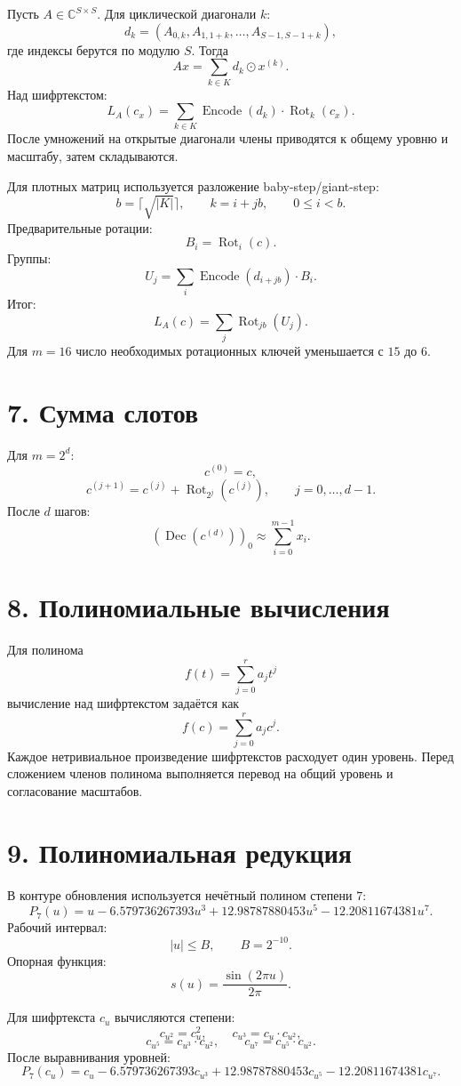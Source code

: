 \documentclass[12pt]{article}
\newcommand{\Dec}{\operatorname{Dec}}
\newcommand{\Encode}{\operatorname{Encode}}
\newcommand{\Rot}{\operatorname{Rot}}
\begin{document}
Пусть \(A\in\mathbb{C}^{S\times S}\). Для циклической диагонали \(k\):
\[
    d_k=(A_{0,k},A_{1,1+k},\ldots,A_{S-1,S-1+k}),
\]
где индексы берутся по модулю \(S\). Тогда
\[
    Ax=\sum_{k\in K}d_k\odot x^{(k)}.
\]
Над шифртекстом:
\[
    L_A(c_x)=
    \sum_{k\in K}\Encode(d_k)\cdot\Rot_k(c_x).
\]
После умножений на открытые диагонали члены приводятся к общему уровню и
масштабу, затем складываются.

Для плотных матриц используется разложение baby-step/giant-step:
\[
    b=\lceil\sqrt{|K|}\rceil,\qquad k=i+jb,\qquad 0\leq i<b.
\]
Предварительные ротации:
\[
    B_i=\Rot_i(c).
\]
Группы:
\[
    U_j=\sum_i\Encode(d_{i+jb})\cdot B_i.
\]
Итог:
\[
    L_A(c)=\sum_j\Rot_{jb}(U_j).
\]
Для \(m=16\) число необходимых ротационных ключей уменьшается с \(15\) до
\(6\).

\section*{7. Сумма слотов}

Для \(m=2^d\):
\[
    c^{(0)}=c,
\]
\[
    c^{(j+1)}
    =
    c^{(j)}+\Rot_{2^j}(c^{(j)}),
    \qquad
    j=0,\ldots,d-1.
\]
После \(d\) шагов:
\[
    \left(\Dec(c^{(d)})\right)_0
    \approx
    \sum_{i=0}^{m-1}x_i.
\]

\section*{8. Полиномиальные вычисления}

Для полинома
\[
    f(t)=\sum_{j=0}^{r}a_jt^j
\]
вычисление над шифртекстом задаётся как
\[
    f(c)=\sum_{j=0}^{r}a_jc^j.
\]
Каждое нетривиальное произведение шифртекстов расходует один уровень.
Перед сложением членов полинома выполняется перевод на общий уровень и
согласование масштабов.

\section*{9. Полиномиальная редукция}

В контуре обновления используется нечётный полином степени \(7\):
\[
    P_7(u)
    =
    u
    -6.579736267393u^3
    +12.98787880453u^5
    -12.20811674381u^7.
\]
Рабочий интервал:
\[
    |u|\leq B,
    \qquad
    B=2^{-10}.
\]
Опорная функция:
\[
    s(u)=\frac{\sin(2\pi u)}{2\pi}.
\]

Для шифртекста \(c_u\) вычисляются степени:
\[
    c_{u^2}=c_u^2,
    \qquad
    c_{u^3}=c_u\cdot c_{u^2},
\]
\[
    c_{u^5}=c_{u^3}\cdot c_{u^2},
    \qquad
    c_{u^7}=c_{u^5}\cdot c_{u^2}.
\]
После выравнивания уровней:
\[
    P_7(c_u)
    =
    c_u
    -6.579736267393c_{u^3}
    +12.98787880453c_{u^5}
    -12.20811674381c_{u^7}.
\]
\end{document}
